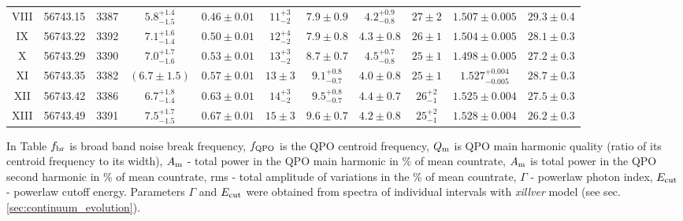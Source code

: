 \documentclass[a4paper,fleqn,usenatbib]{mnras}
\begin{document}
\begin{table}
\begin{tabular}{|c|c|c|c|c|c|c|c|c|c|c|}
VIII & 56743.15 & 3387 & $5.8_{-1.5}^{+1.4}$ & $0.46\pm0.01$ & $11_{-2}^{+3}$ & $7.9\pm0.9$ & $4.2_{-0.8}^{+0.9}$ & $27\pm2$ & $1.507\pm0.005$ & $29.3\pm0.4$ \\
IX & 56743.22 & 3392 & $7.1_{-1.4}^{+1.6}$ & $0.50\pm0.01$ & $12_{-2}^{+4}$ & $7.9\pm0.8$ & $4.3\pm0.8$ & $26\pm1$ & $1.504\pm0.005$ & $28.1\pm0.3$ \\
X & 56743.29 & 3390 & $7.0_{-1.6}^{+1.7}$ & $0.53\pm0.01$ & $13_{-2}^{+3}$ & $8.7\pm0.7$ & $4.5_{-0.8}^{+0.7}$ & $25\pm1$ & $1.498\pm0.005$ & $27.2\pm0.3$ \\
XI & 56743.35 & 3382 & $(6.7\pm1.5)$ & $0.57\pm0.01$ & $13\pm3$ & $9.1_{-0.7}^{+0.8}$ & $4.0\pm0.8$ & $25\pm1$ & $1.527_{-0.005}^{+0.004}$ & $28.7\pm0.3$ \\
XII & 56743.42 & 3386 & $6.7_{-1.4}^{+1.8}$ & $0.63\pm0.01$ & $14_{-2}^{+3}$ & $9.5_{-0.7}^{+0.8}$ & $4.4\pm0.7$ & $26_{-1}^{+2}$ & $1.525\pm0.004$ & $27.5\pm0.3$ \\
XIII & 56743.49 & 3391 & $7.5_{-1.5}^{+1.7}$ & $0.67\pm0.01$ & $15\pm3$ & $9.6\pm0.7$ & $4.2\pm0.8$ & $25_{-1}^{+2}$ & $1.528\pm0.004$ & $26.2\pm0.3$ \\
\hline
\end{tabular}
\begin{flushleft}
        In Table $f_{\rm br}$ is broad band noise break frequency, $f_{\rm QPO}$ is the QPO centroid frequency, $Q_{\rm m}$ is QPO main harmonic quality (ratio of its centroid frequency to its width), $A_{\rm m}$ - total power in the QPO main harmonic in \% of mean countrate, $A_{\rm m}$ is total power in the QPO second harmonic in \% of mean countrate, rms - total amplitude of variations in the \% of mean countrate, $\Gamma$ - powerlaw photon index, $E_{\rm cut}$ - powerlaw cutoff energy. Parameters $\Gamma$ and $E_{\rm cut}$ were obtained from spectra of individual intervals with {\it xillver} model (see sec.\ref{sec:continuum_evolution}).
\end{flushleft}
\end{table}

\end{document}

